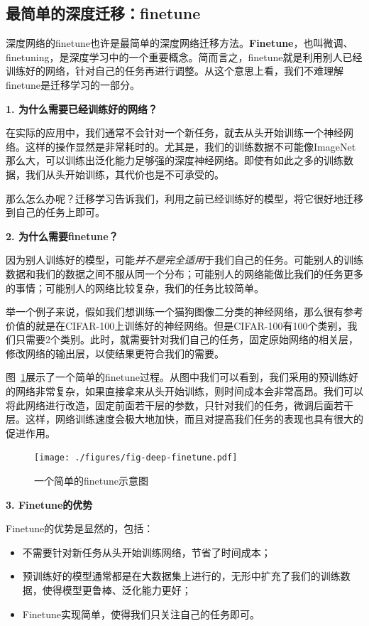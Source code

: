 \subsection{最简单的深度迁移：finetune}

深度网络的finetune也许是最简单的深度网络迁移方法。\textbf{Finetune}，也叫微调、finetuning，是深度学习中的一个重要概念。简而言之，finetune就是利用别人已经训练好的网络，针对自己的任务再进行调整。从这个意思上看，我们不难理解finetune是迁移学习的一部分。

\textbf{1. 为什么需要已经训练好的网络？}

在实际的应用中，我们通常不会针对一个新任务，就去从头开始训练一个神经网络。这样的操作显然是非常耗时的。尤其是，我们的训练数据不可能像ImageNet那么大，可以训练出泛化能力足够强的深度神经网络。即使有如此之多的训练数据，我们从头开始训练，其代价也是不可承受的。

那么怎么办呢？迁移学习告诉我们，利用之前已经训练好的模型，将它很好地迁移到自己的任务上即可。

\textbf{2. 为什么需要finetune？}

因为别人训练好的模型，可能\textit{并不是完全适用}于我们自己的任务。可能别人的训练数据和我们的数据之间不服从同一个分布；可能别人的网络能做比我们的任务更多的事情；可能别人的网络比较复杂，我们的任务比较简单。

举一个例子来说，假如我们想训练一个猫狗图像二分类的神经网络，那么很有参考价值的就是在CIFAR-100上训练好的神经网络。但是CIFAR-100有100个类别，我们只需要2个类别。此时，就需要针对我们自己的任务，固定原始网络的相关层，修改网络的输出层，以使结果更符合我们的需要。

图~\ref{fig-deep-finetune}展示了一个简单的finetune过程。从图中我们可以看到，我们采用的预训练好的网络非常复杂，如果直接拿来从头开始训练，则时间成本会非常高昂。我们可以将此网络进行改造，固定前面若干层的参数，只针对我们的任务，微调后面若干层。这样，网络训练速度会极大地加快，而且对提高我们任务的表现也具有很大的促进作用。

\begin{figure}[htbp]
	\centering
	\texttt{[image: ./figures/fig-deep-finetune.pdf]}
	\caption{一个简单的finetune示意图}
	\label{fig-deep-finetune}
\end{figure}

\textbf{3. Finetune的优势}

Finetune的优势是显然的，包括：

\begin{itemize}
	\item 不需要针对新任务从头开始训练网络，节省了时间成本；
	\item 预训练好的模型通常都是在大数据集上进行的，无形中扩充了我们的训练数据，使得模型更鲁棒、泛化能力更好；
	\item Finetune实现简单，使得我们只关注自己的任务即可。
\end{itemize}

